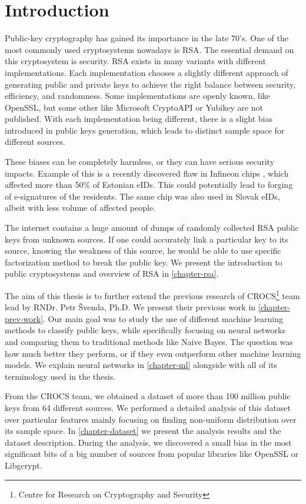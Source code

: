 \chapter{Introduction}

Public-key cryptography has gained its importance in the late 70's. One of the most commonly used cryptosystems nowadays is RSA. The essential demand on this cryptosystem is security. RSA exists in many variants with different implementations. Each implementation chooses a slightly different approach of generating public and private keys to achieve the right balance between security, efficiency, and randomness. Some implementations are openly known, like OpenSSL, but some other like Microsoft CryptoAPI or Yubikey are not published. With each implementation being different, there is a slight bias introduced in public keys generation, which leads to distinct sample space for different sources. 

These biases can be completely harmless, or they can have serious security impacts. Example of this is a recently discovered flaw in Infineon chips \cite{svenda_2}, which affected more than 50\% of Estonian eIDs. This could potentially lead to forging of e-signatures of the residents. The same chip was also used in Slovak eIDs, albeit with less volume of affected people.

The internet contains a huge amount of dumps of randomly collected RSA public keys from unknown sources. If one could accurately link a particular key to its source, knowing the weakness of this source, he would be able to use specific factorization method to break the public key. We present the introduction to public cryptosystems and overview of RSA in \autoref{chapter-rsa}.

The aim of this thesis is to further extend the previous research of CROCS\footnote{Centre for Research on Cryptography and Security} team \cite{svenda_1}\cite{svenda_3} lead by RNDr. Petr Švenda, Ph.D. We present their previous work in \autoref{chapter-prev-work}. Our main goal was to study the use of different machine learning methods to classify public keys, while specifically focusing on neural networks and comparing them to traditional methods like Naive Bayes. The question was how much better they perform, or if they even outperform other machine learning models. We explain neural networks in \autoref{chapter-ml} alongside with all of its terminology used in the thesis.

From the CROCS team, we obtained a dataset of more than 100 million public keys from 64 different sources. We performed a detailed analysis of this dataset over particular features mainly focusing on finding non-uniform distribution over its sample space. In \autoref{chapter-dataset} we present the analysis results and the dataset description. During the analysis, we discovered a small bias in the most significant bits of a big number of sources from popular libraries like OpenSSL or Libgcrypt.

